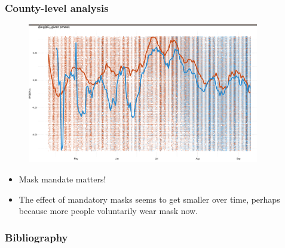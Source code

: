 \documentclass{beamer}
\begin{document}
\begin{frame}
  \frametitle{County-level analysis}\vspace{-0.05cm}



\begin{figure}[ht]
  \begin{minipage}{\linewidth}
    \centering 
       \includegraphics[width=0.9\textwidth]{county-mask-cases.png} 
  \end{minipage}
\end{figure}

\begin{itemize}
\item
Mask mandate matters!
\item The effect of mandatory masks seems to get smaller over time, perhaps because more people voluntarily wear mask now.
\end{itemize}

\end{frame}




\begin{frame}[allowframebreaks]
\frametitle{Bibliography}
\footnotesize

\end{frame}


 
\end{document}
